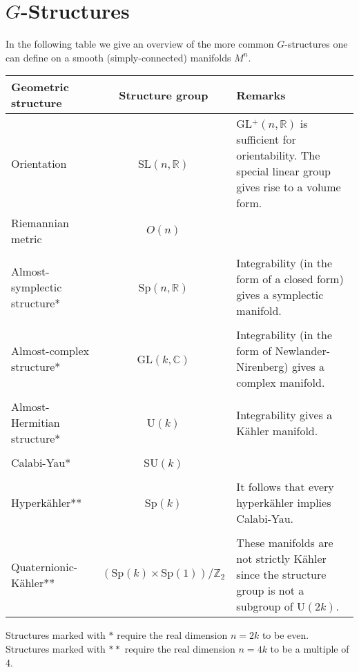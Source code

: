 \chapter{\texorpdfstring{$G$-Structures}{G-Structures}}

	In the following table we give an overview of the more common $G$-structures one can define on a smooth (simply-connected) manifolds $M^n$.
	\begin{center}
		\begin{tabularx}{\textwidth}{|l|c|X|}
			 \hline
			 	Geometric structure&Structure group&Remarks\\
			 \hline
			 	Orientation&SL$(n, \mathbb{R})$&GL$^+(n, \mathbb{R})$ is sufficient for orientability. The special linear group gives rise to a volume form.\\
			 	Riemannian metric&$O(n)$&\\&&\\
			 	Almost-symplectic structure*&Sp$(n, \mathbb{R})$&Integrability (in the form of a closed form) gives a symplectic manifold.\\&&\\
			 	Almost-complex structure*&GL$(k, \mathbb{C})$&Integrability (in the form of Newlander-Nirenberg) gives a complex manifold.\\&&\\
			 	Almost-Hermitian structure*&U$(k)$&Integrability gives a K\"ahler manifold.\\&&\\
			 	Calabi-Yau*&SU$(k)$&\\&&\\
			 	Hyperk\"ahler**&Sp$(k)$&It follows that every hyperk\"ahler implies Calabi-Yau.\\&&\\
			 	Quaternionic-K\"ahler**\footnotemark&$(\text{Sp}(k)\times\text{Sp}(1))/\mathbb{Z}_2$&These manifolds are not strictly K\"ahler since the structure group is not a subgroup of U$(2k)$.\\
			 \hline
		\end{tabularx}
	\end{center}
	Structures marked with $\ast$ require the real dimension $n=2k$ to be even. Structures marked with $\ast\ast$ require the real dimension $n=4k$ to be a multiple of 4.
	
